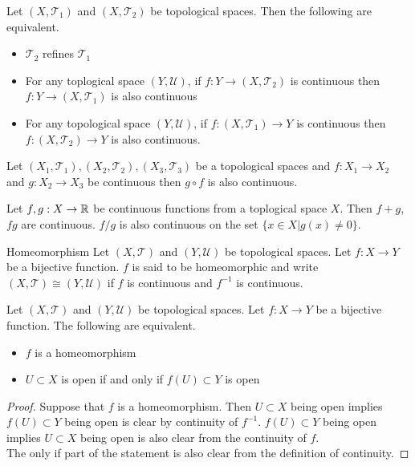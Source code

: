 \documentclass[a4paper]{article}
\begin{document}
\begin{prp}{}{} Let $(X,\mathcal{T}_1)$ and $(X,\mathcal{T}_2)$ be topological spaces. Then the following are equivalent. 
\begin{itemize}
\item $\mathcal{T}_2$ refines $\mathcal{T}_1$
\item For any toplogical space $(Y,\mathcal{U})$, if $f:Y\to (X,\mathcal{T}_2)$ is continuous then $f:Y\to (X,\mathcal{T}_1)$ is also continuous
\item For any topological space $(Y,\mathcal{U})$, if $f:(X,\mathcal{T}_1)\to Y$ is continuous then $f:(X,\mathcal{T}_2)\to Y$ is also continuous. 
\end{itemize}
\end{prp}

\begin{prp}{}{} Let $(X_1,\mathcal{T}_1),(X_2,\mathcal{T}_2),(X_3,\mathcal{T}_3)$ be a topological spaces and $f:X_1\to X_2$ and $g:X_2\to X_3$ be continuous then $g\circ f$ is also continuous. 
\end{prp}

\begin{prp}{}{} Let $f,g:X\to\mathbb{R}$ be continuous functions from a toplogical space $X$. Then $f+g$, $fg$ are continuous. $f/g$ is also continuous on the set $\{x\in X|g(x)\neq 0\}$. 
\end{prp}

\begin{defn}{Homeomorphism}{} Let $(X,\mathcal{T})$ and $(Y,\mathcal{U})$ be topological spaces. Let $f:X\to Y$ be a bijective function. $f$ is said to be homeomorphic and write $(X,\mathcal{T})\cong(Y,\mathcal{U})$ if $f$ is continuous and $f^{-1}$ is continuous. 
\end{defn}

\begin{prp}{}{} Let $(X,\mathcal{T})$ and $(Y,\mathcal{U})$ be topological spaces. Let $f:X\to Y$ be a bijective function. The following are equivalent. 
\begin{itemize}
\item $f$ is a homeomorphism
\item $U\subset X$ is open if and only if $f(U)\subset Y$ is open
\end{itemize} 
\begin{proof}
Suppose that $f$ is a homeomorphism. Then $U\subset X$ being open implies $f(U)\subset Y$ being open is clear by continuity of $f^{-1}$. $f(U)\subset Y$ being open implies $U\subset X$ being open is also clear from the continuity of $f$. \\
The only if part of the statement is also clear from the definition of continuity. 
\end{proof}
\end{prp}
\end{document}
